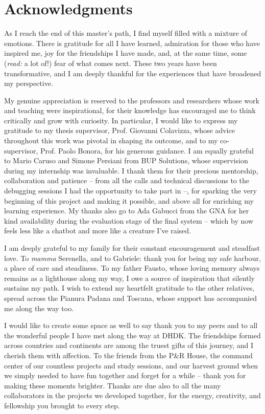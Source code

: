 \chapter{Acknowledgments}

\begin{spacing}{1.5}
As I reach the end of this master’s path, I find myself filled with a mixture of emotions. There is gratitude for all I have learned, admiration for those who have inspired me, joy for the friendships I have made, and, at the same time, some (\textit{read:} a lot of!) fear of what comes next. These two years have been transformative, and I am deeply thankful for the experiences that have broadened my perspective.

My genuine appreciation is reserved to the professors and researchers whose work and teaching were inspirational, for their knowledge has encouraged me to think critically and grow with curiosity. In particular, I would like to express my gratitude to my thesis supervisor, Prof. Giovanni Colavizza, whose advice throughout this work was pivotal in shaping its outcome, and to my co-supervisor, Prof. Paolo Bonora, for his generous guidance. I am equally grateful to Mario Caruso and Simone Persiani from BUP Solutions, whose supervision during my internship was invaluable. I thank them for their precious mentorship, collaboration and patience -- from all the calls and technical discussions to the debugging sessions I had the opportunity to take part in --, for sparking the very beginning of this project and making it possible, and above all for enriching my learning experience. My thanks also go to Ada Gabucci from the GNA for her kind availability during the evaluation stage of the final system -- which by now feels less like a chatbot and more like a creature I’ve raised.

I am deeply grateful to my family for their constant encouragement and steadfast love. To \textit{mamma} Serenella, and to Gabriele: thank you for being my safe harbour, a place of care and steadiness. To my father Fausto, whose loving memory always remains as a lighthouse along my way, I owe a source of inspiration that silently sustains my path. I wish to extend my heartfelt gratitude to the other relatives, spread across the Pianura Padana and Toscana, whose support has accompanied me along the way too.

I would like to create some space as well to say thank you to my peers and to all the wonderful people I have met along the way at DHDK. The friendships formed across countries and continents are among the truest gifts of this journey, and I cherish them with affection. To the friends from the P\&R House, the command center of our countless projects and study sessions, and our harvest ground when we simply needed to have fun together and forget for a while -- thank you for making these moments brighter. Thanks are due also to all the many collaborators in the projects we developed together, for the energy, creativity, and fellowship you brought to every step.


\end{spacing}
